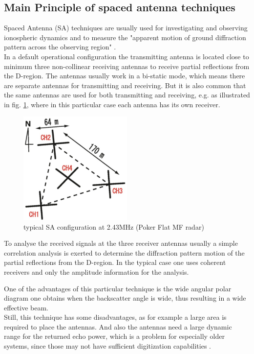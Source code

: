 \subsection{Main Principle of spaced antenna techniques}
Spaced Antenna (SA) techniques are usually used for investigating and observing ionospheric dynamics and to measure the "apparent motion of ground diffraction pattern across the observing region" \citep{reid2015mf}.\\
In a default operational configuration the transmitting antenna is located close to minimum three non-collinear receiving antennas to receive partial reflections from the D-region. The antennas usually work in a bi-static mode, which means there are separate antennas for transmitting and receiving. But it is also common that the same antennas are used for both transmitting and receiving, e.g. as illustrated in fig. \ref{fig:SAconfing}, where in this particular case each antenna has its own receiver.

\begin{figure}
	\centering
	\includegraphics[width=0.5\textwidth]{images/SA_config}
	\caption{typical SA configuration at 2.43MHz (Poker Flat MF radar) \citep[c.f][Fig. 2]{reid2015mf} }
	\label{fig:SAconfing}
\end{figure}

To analyse the received signals at the three receiver antennas usually a simple correlation analysis is exerted to determine the diffraction pattern motion of the partial reflections from the D-region. In the typical case one uses coherent receivers and only the amplitude information for the analysis.

One of the advantages of this particular technique is the wide angular polar diagram one obtains when the backscatter angle is wide, thus resulting in a wide effective beam.\\
Still, this technique has some disadvantages, as for example a large area is required to place the antennas. And also the antennas need a large dynamic range for the returned echo power, which is a problem for especially older systems, since those may not have sufficient digitization capabilities \citep{reid2015mf}.

